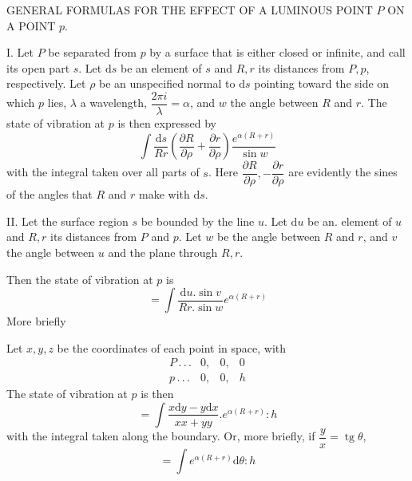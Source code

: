 \begin{center}GENERAL FORMULAS FOR THE EFFECT OF A LUMINOUS POINT $P$ ON A POINT $p$.\end{center}
I. Let $P$ be separated from $p$ by a surface that is either closed or infinite, and call its open part $s$. Let $\mathrm ds$ be an element of $s$ and $R,r$ its distances from $P,p$, respectively. Let $\rho$ be an unspecified normal to $\mathrm ds$ pointing toward the side on which $p$ lies, $\lambda$ a wavelength, $\dfrac{2\pi i}{\lambda}=\alpha$, and $w$ the angle between $R$ and $r$. The state of vibration at $p$ is then expressed by
\[
\int\frac{\mathrm ds}{Rr}\left(\frac{\partial R}{\partial\rho}+\frac{\partial r}{\partial\rho}\right)\frac{e^{\alpha(R+r)}}{\sin w}
\]
with the integral taken over all parts of $s$. Here $\dfrac{\partial R}{\partial\rho},-\dfrac{\partial r}{\partial\rho}$ are evidently the sines of the angles that $R$ and $r$ make with $\mathrm ds$.

II. Let the surface region $s$ be bounded by the line $u$. Let $\mathrm du$ be an. element of $u$ and $R,r$ its distances from $P$ and $p$. Let $w$ be the angle between $R$ and $r$, and $v$ the angle between $u$ and the plane through $R,r$.

Then the state of vibration at $p$ is
\[
=\int\frac{\mathrm du.\sin v}{Rr.\sin w}e^{\alpha(R+r)}
\]
More briefly

Let $x,y,z$ be the coordinates of each point in space, with
\[
\begin{array}{lccc}
P\, .\, .\, .&0,&0,&0\\
p\, .\, .\, .&0,&0,&h
\end{array}
\]
The state of vibration at $p$ is then
\[
=\int\frac{x\mathrm dy-y\mathrm dx}{xx+yy}.e^{\alpha(R+r)}:h
\]
with the integral taken along the boundary. Or, more briefly, if $\dfrac yx=\operatorname{tg}\theta$,
\[
=\int e^{\alpha(R+r)}\mathrm d\theta:h
\]

